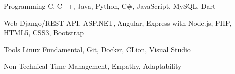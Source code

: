 
\begin{cvskills}
  \cvskill
    {Programming} %
    { C, C++,  Java, Python, C\#, JavaScript, MySQL, Dart} %

  \cvskill
    {Web} %
    {Django/REST API, ASP.NET, Angular, Express with Node.js, PHP, HTML5, CSS3, Bootstrap} %
   
   \cvskill
    {Tools} %
    {Linux Fundamental, Git, Docker, CLion, Visual Studio} %
    
    \cvskill
    {Non-Technical} %
    {Time Management, Empathy, Adaptability} %
    
\end{cvskills}

